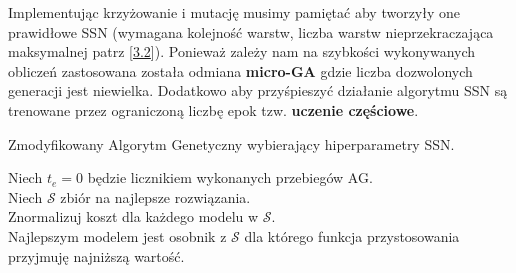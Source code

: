 \documentclass{article}
\begin{document}
Implementując krzyżowanie i mutację musimy pamiętać aby tworzyły one prawidłowe SSN 
(wymagana kolejność warstw, liczba warstw nieprzekraczająca maksymalnej
 patrz [\hyperref[sec:ossn]{3.2}]).
Ponieważ zależy nam na szybkości wykonywanych obliczeń zastosowana została odmiana 
\textbf{micro-GA} gdzie liczba dozwolonych generacji jest niewielka. Dodatkowo aby przyśpieszyć
działanie algorytmu SSN są trenowane przez ograniczoną liczbę epok tzw. \textbf{uczenie
częściowe}.

\begin{algorithm}[H]
 \SetAlgoLined
 \caption{Zmodyfikowany Algorytm Genetyczny wybierający hiperparametry SSN.}
 Niech $t_e = 0$ będzie licznikiem wykonanych przebiegów AG.\\
 Niech $\mathcal{S}$ zbiór na najlepsze rozwiązania.\\
  Znormalizuj koszt dla każdego modelu w $\mathcal{S}$.\\
  Najlepszym modelem jest osobnik z $\mathcal{S}$ dla którego funkcja przystosowania
  przyjmuję najniższą wartość.
\end{algorithm}
\end{document}
